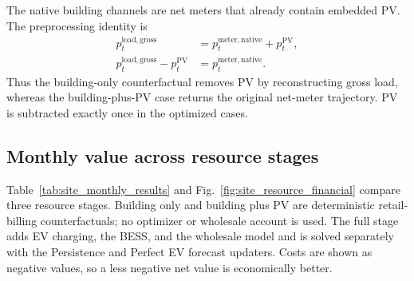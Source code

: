 \documentclass[final,5p,times]{elsarticle}
\newcommand{\PV}{\mathrm{PV}}
\newcommand{\load}{\mathrm{load}}
\begin{document}
The native building channels are net meters that already contain embedded PV.
The preprocessing identity is
\begin{equation}
\begin{aligned}
p_t^{\load,\mathrm{gross}}
&=p_t^{\mathrm{meter,native}}+p_t^{\PV},\\
p_t^{\load,\mathrm{gross}}-p_t^{\PV}
&=p_t^{\mathrm{meter,native}}.
\end{aligned}
\label{eq:site_net_meter_identity}
\end{equation}
Thus the building-only counterfactual removes PV by reconstructing gross load,
whereas the building-plus-PV case returns the original net-meter trajectory.
PV is subtracted exactly once in the optimized cases.

\subsection{Monthly value across resource stages}
\label{sec:site_monthly_value}

Table~\ref{tab:site_monthly_results} and
Fig.~\ref{fig:site_resource_financial} compare three resource stages. Building
only and building plus PV are deterministic retail-billing counterfactuals; no
optimizer or wholesale account is used. The full stage adds EV charging, the
BESS, and the wholesale model and is solved separately with the Persistence and
Perfect EV forecast updaters. Costs are shown as negative values, so a less
negative net value is economically better.
\end{document}
